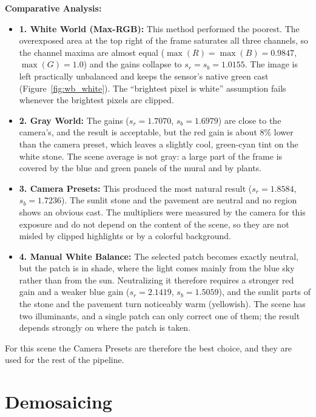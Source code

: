 \documentclass[a4paper]{article}
\begin{document}
\textbf{Comparative Analysis:}
\begin{itemize}
    \item \textbf{1. White World (Max-RGB):} This method performed the poorest. The overexposed area at the top right of the frame saturates all three channels, so the channel maxima are almost equal ($\max(R) = \max(B) = 0.9847$, $\max(G) = 1.0$) and the gains collapse to $s_r = s_b = 1.0155$. The image is left practically unbalanced and keeps the sensor's native green cast (Figure~\ref{fig:wb_white}). The ``brightest pixel is white'' assumption fails whenever the brightest pixels are clipped.
    \item \textbf{2. Gray World:} The gains ($s_r = 1.7070$, $s_b = 1.6979$) are close to the camera's, and the result is acceptable, but the red gain is about $8\%$ lower than the camera preset, which leaves a slightly cool, green-cyan tint on the white stone. The scene average is not gray: a large part of the frame is covered by the blue and green panels of the mural and by plants.
    \item \textbf{3. Camera Presets:} This produced the most natural result ($s_r = 1.8584$, $s_b = 1.7236$). The sunlit stone and the pavement are neutral and no region shows an obvious cast. The multipliers were measured by the camera for this exposure and do not depend on the content of the scene, so they are not misled by clipped highlights or by a colorful background.
    \item \textbf{4. Manual White Balance:} The selected patch becomes exactly neutral, but the patch is in shade, where the light comes mainly from the blue sky rather than from the sun. Neutralizing it therefore requires a stronger red gain and a weaker blue gain ($s_r = 2.1419$, $s_b = 1.5059$), and the sunlit parts of the stone and the pavement turn noticeably warm (yellowish). The scene has two illuminants, and a single patch can only correct one of them; the result depends strongly on where the patch is taken.
\end{itemize}
For this scene the Camera Presets are therefore the best choice, and they are used for the rest of the pipeline.

\section{Demosaicing}
\end{document}
